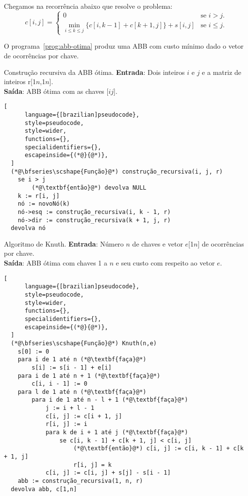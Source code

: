 Chegamos na recorrência abaixo que resolve o problema:
\[
c[i, j] = 
\begin{cases}
    0 & \text{se } i > j. \\
    \min_{i \leq k \leq j} \{ c[i, k - 1] + c[k + 1, j]\} + s[i, j] & \text{se } i \leq j.
\end{cases}
\]

O programa~\ref{prog:abb-otima} produz uma ABB com custo mínimo dado o vetor de ocorrências por chave.

\begin{programruledcaption}{Construção recursiva da ABB ótima.\label{prog:abb-construcao}}
  \noindent\textbf{Entrada}: Dois inteiros $i$ e $j$ e a matriz de inteiros r[1\tdots$n$,1\tdots$n$]. \\
  \textbf{Saída}: ABB ótima com as chaves [$i$\tdots$j$].
  \vspace{-0.5\baselineskip}
  \begin{lstlisting}[
      language={[brazilian]pseudocode},
      style=pseudocode,
      style=wider,
      functions={},
      specialidentifiers={},
      escapeinside={(*@}{@*)},
  ]
  (*@\bfseries\scshape{Função}@*) construção_recursiva(i, j, r)
    se i > j
        (*@\textbf{então}@*) devolva NULL
    k := r[i, j]
    nó := novoNó(k)
    nó->esq := construção_recursiva(i, k - 1, r)
    nó->dir := construção_recursiva(k + 1, j, r)
  devolva nó
  \end{lstlisting}
  \vspace{-0.5\baselineskip}
\end{programruledcaption}

\begin{programruledcaption}{Algoritmo de Knuth.\label{prog:abb-otima}}
  \noindent\textbf{Entrada}: Número $n$ de chaves e vetor $e$[1\tdots$n$] de ocorrências por chave. \\
  \textbf{Saída}: ABB ótima com chaves 1 a $n$ e seu custo com respeito ao vetor $e$.
  \vspace{-0.5\baselineskip}
  \begin{lstlisting}[
      language={[brazilian]pseudocode},
      style=pseudocode,
      style=wider,
      functions={},
      specialidentifiers={},
      escapeinside={(*@}{@*)},
  ]
  (*@\bfseries\scshape{Função}@*) Knuth(n,e)
    s[0] := 0
    para i de 1 até n (*@\textbf{faça}@*)
        s[i] := s[i - 1] + e[i]
    para i de 1 até n + 1 (*@\textbf{faça}@*)
        c[i, i - 1] := 0
    para l de 1 até n (*@\textbf{faça}@*)
        para i de 1 até n - l + 1 (*@\textbf{faça}@*)
            j := i + l - 1
            c[i, j] := c[i + 1, j]
            r[i, j] := i
            para k de i + 1 até j (*@\textbf{faça}@*)
                se c[i, k - 1] + c[k + 1, j] < c[i, j]
                    (*@\textbf{então}@*) c[i, j] := c[i, k - 1] + c[k + 1, j]
                    r[i, j] = k
            c[i, j] := c[i, j] + s[j] - s[i - 1]
    abb := construção_recursiva(1, n, r)
  devolva abb, c[1,n]
  \end{lstlisting}
  \vspace{-0.5\baselineskip}
\end{programruledcaption}

